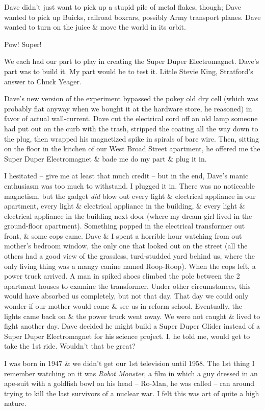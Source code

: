 \documentclass{article}
\numberwithin{equation}{section}
\begin{document}
Dave didn't just want to pick up a stupid pile of metal flakes, though; Dave wanted to pick up Buicks, railroad boxcars, possibly Army transport planes. Dave wanted to turn on the juice \& move the world in its orbit.

Pow! Super!

We each had our part to play in creating the Super Duper Electromagnet. Dave's part was to build it. My part would be to test it. Little Stevie King, Stratford's answer to Chuck Yeager.

Dave's new version of the experiment bypassed the pokey old dry cell (which was probably flat anyway when we bought it at the hardware store, he reasoned) in favor of actual wall-current. Dave cut the electrical cord off an old lamp someone had put out on the curb with the trash, stripped the coating all the way down to the plug, then wrapped his magnetized spike in spirals of bare wire. Then, sitting on the floor in the kitchen of our West Broad Street apartment, he offered me the Super Duper Electromagnet \& bade me do my part \& plug it in.

I hesitated -- give me at least that much credit -- but in the end, Dave's manic enthusiasm was too much to withstand. I plugged it in. There was no noticeable magnetism, but the gadget \textit{did} blow out every light \& electrical appliance in our apartment, every light \& electrical appliance in the building, \& every light \& electrical appliance in the building next door (where my dream-girl lived in the ground-floor apartment). Something popped in the electrical transformer out front, \& some cops came. Dave \& I spent a horrible hour watching from out mother's bedroom window, the only one that looked out on the street (all the others had a good view of the grassless, turd-studded yard behind us, where the only living thing was a mangy canine named Roop-Roop). When the cops left, a power truck arrived. A man in spiked shoes climbed the pole between the 2 apartment houses to examine the transformer. Under other circumstances, this would have absorbed us completely, but not that day. That day we could only wonder if our mother would come \& see us in reform school. Eventually, the lights came back on \& the power truck went away. We were not caught \& lived to fight another day. Dave decided he might build a Super Duper Glider instead of a Super Duper Electromagnet for his science project. I, he told me, would get to take the 1st ride. Wouldn't that be great?

 I was born in 1947 \& we didn't get our 1st television until 1958. The 1st thing I remember watching on it was \textit{Robot Monster}, a film in which a guy dressed in an ape-suit with a goldfish bowl on his head -- Ro-Man, he was called -- ran around trying to kill the last survivors of a nuclear war. I felt this was art of quite a high nature.
\end{document}
